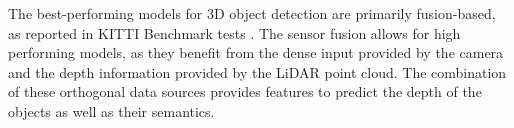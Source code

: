 \documentclass[10pt,twocolumn,letterpaper]{article}
\begin{document}

The best-performing models for 3D object detection are primarily fusion-based, as reported in KITTI Benchmark tests \cite{KITTI2012}. The sensor fusion allows for high performing models, as they benefit from the dense input provided by the camera and the depth information provided by the LiDAR point cloud. The combination of these orthogonal data sources provides features to predict the depth of the objects as well as their semantics.
\end{document}
